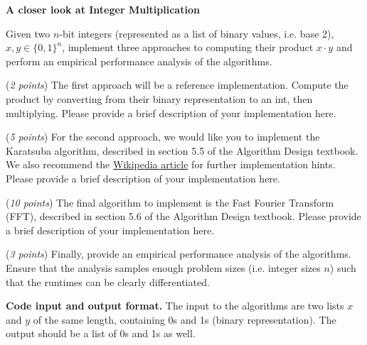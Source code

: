 \documentclass{hw}
\newcommand{\io}{\textbf{Code input and output format.} }
\begin{document}





\begin{challenge}
    \textbf{A closer look at Integer Multiplication}

    Given two $n$-bit integers (represented as a list of binary values, i.e. base 2), $x,y\in\{0,1\}^n$,
    implement three approaches to computing their product $x \cdot y$
    and perform an empirical performance analysis of the algorithms.

    (\textit{2 points}) The first approach will be a reference implementation. Compute the product by converting from their binary representation to an int, then multiplying. Please provide a brief description of your implementation here.

    (\textit{5 points}) For the second approach,
    we would like you to implement the Karatsuba algorithm,
    described in section 5.5 of the Algorithm Design textbook.
    We also recommend the \href{https://en.wikipedia.org/wiki/Karatsuba_algorithm}{Wikipedia article}
    for further implementation hints.
    Please provide a brief description of your implementation here.

    (\textit{10 points}) The final algorithm to implement is the Fast Fourier Transform (FFT), described in
    section 5.6 of the Algorithm Design textbook.
    Please provide a brief description of your implementation here.

    (\textit{3 points}) Finally, provide an empirical performance analysis of the algorithms.
    Ensure that the analysis samples enough problem sizes (i.e. integer sizes $n$)
    such that the runtimes can be clearly differentiated.

    \io The input to the algorithms are two lists $x$ and $y$ of the same length, containing 0s and 1s (binary representation). The output should be a list of 0s and 1s as well.

\end{challenge}
\end{document}
